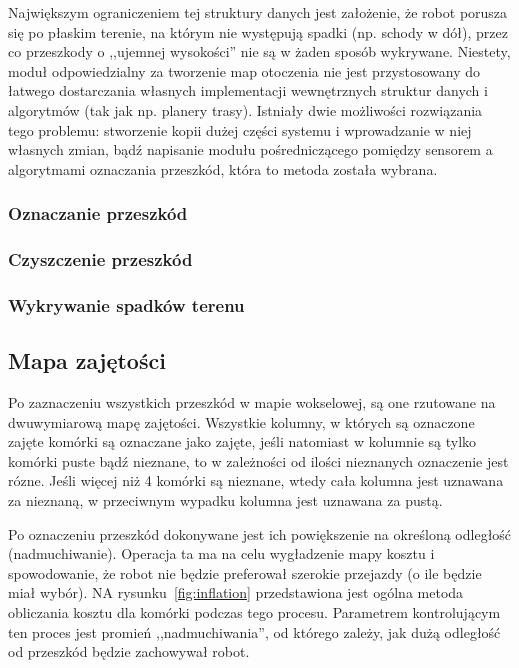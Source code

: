 Największym ograniczeniem tej struktury danych jest założenie, że robot porusza
się po płaskim terenie, na którym nie występują spadki (np. schody w dół), przez
co przeszkody o ,,ujemnej wysokości'' nie są w żaden sposób wykrywane. Niestety,
moduł odpowiedzialny za tworzenie map otoczenia nie jest przystosowany do
łatwego dostarczania własnych implementacji wewnętrznych struktur danych i
algorytmów (tak jak np. planery trasy). Istniały dwie możliwości
rozwiązania tego problemu: stworzenie kopii dużej części systemu i wprowadzanie
w niej własnych zmian, bądź napisanie modułu pośredniczącego pomiędzy sensorem a
algorytmami oznaczania przeszkód, która to metoda została wybrana.

\subsubsection{Oznaczanie przeszkód}

\subsubsection{Czyszczenie przeszkód}

\subsubsection{Wykrywanie spadków terenu}

\subsection{Mapa zajętości}

Po zaznaczeniu wszystkich przeszkód w mapie wokselowej, są one rzutowane na
dwuwymiarową mapę zajętości. Wszystkie kolumny, w których są oznaczone zajęte
komórki są oznaczane jako zajęte, jeśli natomiast w kolumnie są tylko komórki
puste bądź nieznane, to w zależności od ilości nieznanych oznaczenie jest rózne.
Jeśli więcej niż 4 komórki są nieznane, wtedy cała kolumna jest uznawana za
nieznaną, w przeciwnym wypadku kolumna jest uznawana za pustą.

Po oznaczeniu przeszkód dokonywane jest ich powiększenie na określoną odległość
(nadmuchiwanie). Operacja ta ma na celu wygładzenie mapy kosztu i spowodowanie,
że robot nie będzie preferował szerokie przejazdy (o ile będzie miał wybór). NA
rysunku~\ref{fig:inflation} przedstawiona jest ogólna metoda obliczania kosztu
dla komórki podczas tego procesu. Parametrem kontrolującym ten proces jest
promień ,,nadmuchiwania'', od którego zależy, jak dużą odległość od
przeszkód będzie zachowywał robot.

